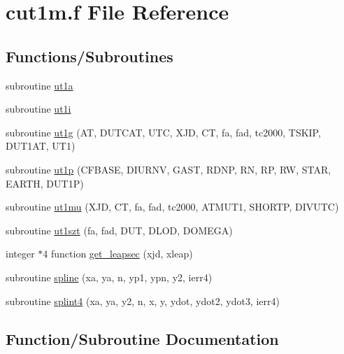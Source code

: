 \hypertarget{cut1m_8f}{}\section{cut1m.\+f File Reference}
\label{cut1m_8f}
\subsection*{Functions/\+Subroutines}
\begin{DoxyCompactItemize}
\item 
subroutine \hyperlink{cut1m_8f_ad2c010d077ecc104ddcc9ae29167c76b}{ut1a}
\item 
subroutine \hyperlink{cut1m_8f_a26b8146cd94e4a6747346b49e023b29a}{ut1i}
\item 
subroutine \hyperlink{cut1m_8f_a6bb59e024b3a91ed736356a8c8fea840}{ut1g} (AT, D\+U\+T\+C\+AT, U\+TC, X\+JD, CT, fa, fad, tc2000, T\+S\+K\+IP, D\+U\+T1\+AT, U\+T1)
\item 
subroutine \hyperlink{cut1m_8f_a6a0332082e4f2034de0ed9c8ec336b00}{ut1p} (C\+F\+B\+A\+SE, D\+I\+U\+R\+NV, G\+A\+ST, R\+D\+NP, RN, RP, RW, S\+T\+AR, E\+A\+R\+TH, D\+U\+T1P)
\item 
subroutine \hyperlink{cut1m_8f_abc7bd813d2132d56472aca4e187f3c2c}{ut1mu} (X\+JD, CT, fa, fad, tc2000, A\+T\+M\+U\+T1, S\+H\+O\+R\+TP, D\+I\+V\+U\+TC)
\item 
subroutine \hyperlink{cut1m_8f_a838224410c242c01aa2cbbabe557347e}{ut1szt} (fa, fad, D\+UT, D\+L\+OD, D\+O\+M\+E\+GA)
\item 
integer $\ast$4 function \hyperlink{cut1m_8f_a631cc5da4b17a4694df80a60e60dcb1c}{get\+\_\+leapsec} (xjd, xleap)
\item 
subroutine \hyperlink{cut1m_8f_a86702ff457c343d1d2eb7d4bdc1d9671}{spline} (xa, ya, n, yp1, ypn, y2, ierr4)
\item 
subroutine \hyperlink{cut1m_8f_aa9fa0903230955ebe5f1866b735fe449}{splint4} (xa, ya, y2, n, x, y, ydot, ydot2, ydot3, ierr4)
\end{DoxyCompactItemize}


\subsection{Function/\+Subroutine Documentation}
\mbox{\label{cut1m_8f_a631cc5da4b17a4694df80a60e60dcb1c}} 
